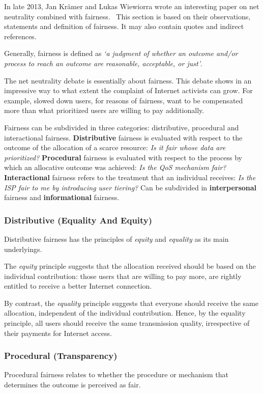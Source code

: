 
In late 2013, Jan Kr\"{a}mer and Lukas Wiewiorra wrote an interesting paper on net neutrality combined with fairness.~\cite{kramer2013fair} This section is based on their observations, statements and definition of fairness. It may also contain quotes and indirect references.

Generally, fairness is defined as \emph{`a judgment of whether an outcome and/or process to reach an outcome are reasonable, acceptable, or just'}.

The net neutrality debate is essentially about fairness. This debate shows in an impressive way to what extent the complaint of Internet activists can grow. For example, slowed down users, for reasons of fairness, want to be compensated more than what prioritized users are willing to pay additionally.

Fairness can be subdivided in three categories: distributive, procedural and interactional fairness. \textbf{Distributive} fairness is evaluated with respect to the outcome of the allocation of a scarce resource: \emph{Is it fair whose data are prioritized?} \textbf{Procedural} fairness is evaluated with respect to the process by which an allocative outcome was achieved: \emph{Is the QoS mechanism fair?} \textbf{Interactional} fairness refers to the treatment that an individual receives: \emph{Is the ISP fair to me by introducing user tiering?} Can be subdivided in \textbf{interpersonal} fairness and \textbf{informational} fairness.

\subsubsection{Distributive (Equality And Equity)}
Distributive fairness has the principles of \emph{equity} and \emph{equality} as its main underlyings.

The \emph{equity} principle suggests that the allocation received should be based on the individual contribution: those users that are willing to pay more, are rightly entitled to receive a better Internet connection.

By contrast, the \emph{equality} principle suggests that everyone should receive the same allocation, independent of the individual contribution. Hence, by the equality principle, all users should receive the same transmission quality, irrespective of their payments for Internet access.

\subsubsection{Procedural (Transparency)}
Procedural fairness relates to whether the procedure or mechanism that determines the outcome is perceived as fair.

